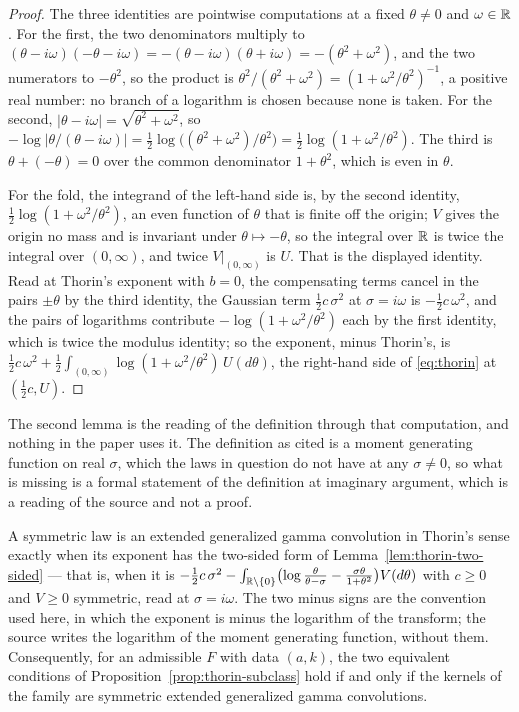 \begin{proof}
The three identities are pointwise computations at a fixed $\theta \ne 0$ and $\omega \in \mathbb{R}$.
For the first, the two denominators multiply to $(\theta - i\omega)(-\theta - i\omega)
= -(\theta - i\omega)(\theta + i\omega) = -(\theta^2 + \omega^2)$, and the two numerators to
$-\theta^2$, so the product is $\theta^2/(\theta^2 + \omega^2) = (1 + \omega^2/\theta^2)^{-1}$,
a positive real number: no branch of a logarithm is chosen because none is taken. For the
second, $|\theta - i\omega| = \sqrt{\theta^2 + \omega^2}$, so
$-\log|\theta/(\theta - i\omega)| = \tfrac12\log\bigl((\theta^2+\omega^2)/\theta^2\bigr)
= \tfrac12\log(1 + \omega^2/\theta^2)$. The third is $\theta + (-\theta) = 0$ over the common
denominator $1 + \theta^2$, which is even in $\theta$.

For the fold, the integrand of the left-hand side is, by the second identity,
$\tfrac12\log(1 + \omega^2/\theta^2)$, an even function of $\theta$ that is finite off the
origin; $V$ gives the origin no mass and is invariant under $\theta \mapsto -\theta$, so the
integral over $\mathbb{R}$ is twice the integral over $(0,\infty)$, and twice $V|_{(0,\infty)}$ is $U$.
That is the displayed identity. Read at Thorin's exponent with $b = 0$, the compensating terms
cancel in the pairs $\pm\theta$ by the third identity, the Gaussian term $\tfrac12 c\,\sigma^2$
at $\sigma = i\omega$ is $-\tfrac12 c\,\omega^2$, and the pairs of logarithms contribute
$-\log(1 + \omega^2/\theta^2)$ each by the first identity, which is twice the modulus identity;
so the \Levy{} exponent, minus Thorin's, is $\tfrac12 c\,\omega^2 + \tfrac12\int_{(0,\infty)}
\log(1 + \omega^2/\theta^2)\,U(d\theta)$, the right-hand side of \ref{eq:thorin} at
$(\tfrac12 c, U)$.
\end{proof}

The second lemma is the reading of the definition through that computation, and nothing in the
paper uses it. The definition as cited is a moment generating function on real $\sigma$, which the
laws in question do not have at any $\sigma \ne 0$, so what is missing is a formal statement of
the definition at imaginary argument, which is a reading of the source and not a proof.

\begin{lemma}
\label{lem:thorin-ggc}
A symmetric law is an extended generalized gamma convolution in Thorin's sense exactly when its
exponent has the two-sided form of Lemma~\ref{lem:thorin-two-sided} --- that is, when it is
$-\tfrac12c\,\sigma^2 - \int_{\mathbb{R}\setminus\{0\}}\bigl(\log\tfrac{\theta}{\theta-\sigma}
- \tfrac{\sigma\theta}{1+\theta^2}\bigr)V(d\theta)$ with $c \ge 0$ and $V \ge 0$ symmetric, read
at $\sigma = i\omega$. The two minus signs are the convention used here, in which the exponent is
minus the logarithm of the transform; the source writes the logarithm of the moment generating
function, without them. Consequently, for an admissible $F$ with data $(a,k)$, the two equivalent
conditions of Proposition~\ref{prop:thorin-subclass} hold if and only if the kernels of the
family are symmetric extended generalized gamma convolutions.
\end{lemma}

